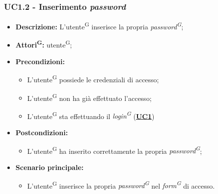\subsubsection{UC1.2 - Inserimento \textit{password}}
\label{sec:UC1.2}
\begin{itemize}
	\item \textbf{Descrizione:} L’utente\textsuperscript{G} inserisce la propria \textit{password\textsuperscript{G}};
	\item \textbf{Attori\textsuperscript{G}:} utente\textsuperscript{G};
	\item \textbf{Precondizioni:} 
	\begin{itemize}
		\item L’utente\textsuperscript{G} possiede le credenziali di accesso;
		\item L’utente\textsuperscript{G} non ha già effettuato l’accesso;
		\item L’utente\textsuperscript{G} sta effettuando il \textit{login\textsuperscript{G}} (\hyperref[sec:UC1]{\textbf{UC1}})
	\end{itemize}
	\item \textbf{Postcondizioni:} 
	\begin{itemize}
		\item L’utente\textsuperscript{G} ha inserito correttamente la propria \textit{password\textsuperscript{G}};
	\end{itemize}
	\item \textbf{Scenario principale:} 
	\begin{itemize}
		\item L’utente\textsuperscript{G} inserisce la propria \textit{password\textsuperscript{G}} nel \textit{form\textsuperscript{G}} di accesso.
	\end{itemize}
\end{itemize}

